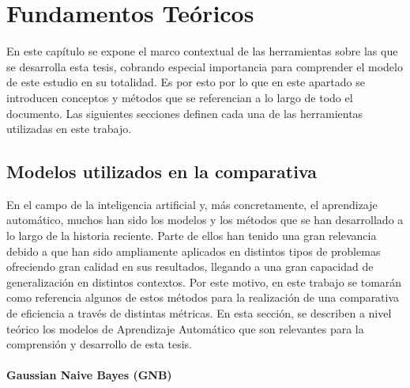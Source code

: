 

\chapter{Fundamentos Teóricos}

En este capítulo se expone el marco contextual de las herramientas sobre las que se desarrolla esta tesis, cobrando especial importancia para comprender el modelo de este estudio en su totalidad. Es por esto por lo que en este apartado se introducen conceptos y métodos que se referencian a lo largo de todo el documento. Las siguientes secciones definen cada una de las herramientas utilizadas en este trabajo.


\section{Modelos utilizados en la comparativa}



En el campo de la inteligencia artificial y, más concretamente, el aprendizaje automático, muchos han sido los modelos y los métodos que se han desarrollado a lo largo de la historia reciente. Parte de ellos han tenido una gran relevancia debido a que han sido ampliamente aplicados en distintos tipos de problemas ofreciendo gran calidad en sus resultados, llegando a una gran capacidad de generalización en distintos contextos. Por este motivo, en este trabajo se tomarán como referencia algunos de estos métodos para la realización de una comparativa de eficiencia a través de distintas métricas. En esta sección, se describen a nivel teórico los modelos de Aprendizaje Automático que son relevantes para la comprensión y desarrollo de esta tesis. 


\subsubsection*{Gaussian Naive Bayes (GNB)}


